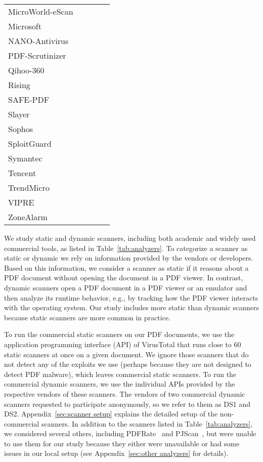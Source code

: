 \begin{table}[tb]
\begin{tabular}{@{}lcccc@{}}
		MicroWorld-eScan & \cmark & & & \cmark \\
		Microsoft & \cmark & & & \cmark \\
		NANO-Antivirus & \cmark & & & \cmark \\
		PDF-Scrutinizer~\cite{schmitt2012pdf} & & \cmark & \cmark & \\
		Qihoo-360 & \cmark & & & \cmark \\
		Rising & \cmark & & & \cmark \\
		SAFE-PDF~\cite{2018arXiv181012490J} & \cmark & & \cmark & \\
		Slayer~\cite{maiorca2012pattern} & \cmark & & \cmark & \\
		Sophos & \cmark & & & \cmark \\
		SploitGuard & & \cmark & & \cmark \\
		Symantec & \cmark & & & \cmark \\
		Tencent & \cmark & & & \cmark \\
		TrendMicro & \cmark & & & \cmark \\
		VIPRE & \cmark & & & \cmark \\
		ZoneAlarm & \cmark & & & \cmark \\
		\bottomrule
	\end{tabular}
\end{table}

We study \nbStaticAnalyzers{} static and \nbDynamicAnalyzers{} dynamic scanners, including both academic and widely used commercial tools, as listed in Table~\ref{tab:analyzers}.
To categorize a scanner as static or dynamic we rely on information provided 
by the vendors or developers.
Based on this information, we consider a scanner as static if it reasons 
about a PDF document without opening the document in a PDF viewer.
In contrast, dynamic scanners open a PDF document in a PDF viewer or an emulator and then 
analyze its runtime behavior, e.g., by tracking how the PDF viewer interacts 
with the operating system.
Our study includes more static than dynamic scanners because static scanners are more common in practice.

To run the commercial static scanners on our PDF documents, we use the application programming interface (API) of VirusTotal that runs close to 60 static scanners at once on a given document. We ignore those scanners that do not detect any of the exploits we use (perhaps because they are not designed to detect PDF malware), which leaves \nbVirusTotalEngines{} commercial static scanners.
To run the commercial dynamic scanners, we use the individual APIs provided by the respective vendors of these scanners.
The vendors of two commercial dynamic scanners requested to participate anonymously, so we refer to them as DS1 and DS2.
Appendix~\ref{sec:scanner setup} explains the detailed setup of the non-commercial scanners.
In addition to the scanners listed in Table~\ref{tab:analyzers}, we considered several others,
including PDFRate~\cite{smutz2012malicious} and PJScan~\cite{laskov2011static}, but were unable to use them for our study because they either were unavailable or had some issues in our local setup (see Appendix~\ref{sec:other analyzers} for details).
